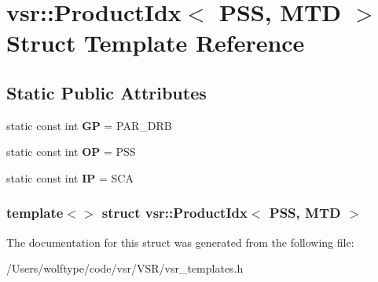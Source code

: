 \hypertarget{structvsr_1_1_product_idx_3_01_p_s_s_00_01_m_t_d_01_4}{\section{vsr\-:\-:Product\-Idx$<$ P\-S\-S, M\-T\-D $>$ Struct Template Reference}
\label{structvsr_1_1_product_idx_3_01_p_s_s_00_01_m_t_d_01_4}
}
\subsection*{Static Public Attributes}
\begin{DoxyCompactItemize}
\item 
\hypertarget{structvsr_1_1_product_idx_3_01_p_s_s_00_01_m_t_d_01_4_a69a6caf3db0df5cccaf5d328e60f3ca4}{static const int {\bfseries G\-P} = P\-A\-R\-\_\-\-D\-R\-B}\label{structvsr_1_1_product_idx_3_01_p_s_s_00_01_m_t_d_01_4_a69a6caf3db0df5cccaf5d328e60f3ca4}

\item 
\hypertarget{structvsr_1_1_product_idx_3_01_p_s_s_00_01_m_t_d_01_4_a01c2d4550cb2300ed044367d8e7b81da}{static const int {\bfseries O\-P} = P\-S\-S}\label{structvsr_1_1_product_idx_3_01_p_s_s_00_01_m_t_d_01_4_a01c2d4550cb2300ed044367d8e7b81da}

\item 
\hypertarget{structvsr_1_1_product_idx_3_01_p_s_s_00_01_m_t_d_01_4_a820012f5f739a4cb53b20c213719a4b3}{static const int {\bfseries I\-P} = S\-C\-A}\label{structvsr_1_1_product_idx_3_01_p_s_s_00_01_m_t_d_01_4_a820012f5f739a4cb53b20c213719a4b3}

\end{DoxyCompactItemize}
\subsubsection*{template$<$$>$ struct vsr\-::\-Product\-Idx$<$ P\-S\-S, M\-T\-D $>$}



The documentation for this struct was generated from the following file\-:\begin{DoxyCompactItemize}
\item 
/\-Users/wolftype/code/vsr/\-V\-S\-R/vsr\-\_\-templates.\-h\end{DoxyCompactItemize}
